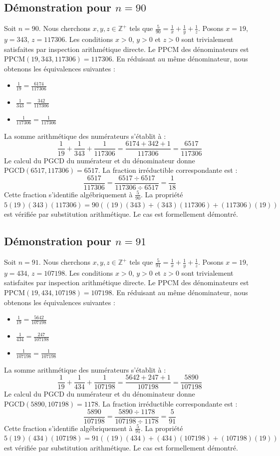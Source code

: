 \documentclass[12pt,a4paper]{article}
\begin{document}
\subsection{Démonstration pour $n = 90$}
Soit $n = 90$. Nous cherchons $x, y, z \in \mathbb{Z}^{+}$ tels que $\frac{5}{90} = \frac{1}{x} + \frac{1}{y} + \frac{1}{z}$.
Posons $x = 19$, $y = 343$, $z = 117306$.
Les conditions $x > 0$, $y > 0$ et $z > 0$ sont trivialement satisfaites par inspection arithmétique directe.
Le PPCM des dénominateurs est $\text{PPCM}(19, 343, 117306) = 117306$.
En réduisant au même dénominateur, nous obtenons les équivalences suivantes :
\begin{itemize}
    \item $\frac{1}{19} = \frac{6174}{117306}$
    \item $\frac{1}{343} = \frac{342}{117306}$
    \item $\frac{1}{117306} = \frac{1}{117306}$
\end{itemize}
La somme arithmétique des numérateurs s'établit à :
$$ \frac{1}{19} + \frac{1}{343} + \frac{1}{117306} = \frac{6174 + 342 + 1}{117306} = \frac{6517}{117306} $$
Le calcul du PGCD du numérateur et du dénominateur donne $\text{PGCD}(6517, 117306) = 6517$.
La fraction irréductible correspondante est :
$$ \frac{6517}{117306} = \frac{6517 \div 6517}{117306 \div 6517} = \frac{1}{18} $$
Cette fraction s'identifie algébriquement à $\frac{5}{90}$.
La propriété $5(19)(343)(117306) = 90((19)(343) + (343)(117306) + (117306)(19))$ est vérifiée par substitution arithmétique.
Le cas est formellement démontré.

\subsection{Démonstration pour $n = 91$}
Soit $n = 91$. Nous cherchons $x, y, z \in \mathbb{Z}^{+}$ tels que $\frac{5}{91} = \frac{1}{x} + \frac{1}{y} + \frac{1}{z}$.
Posons $x = 19$, $y = 434$, $z = 107198$.
Les conditions $x > 0$, $y > 0$ et $z > 0$ sont trivialement satisfaites par inspection arithmétique directe.
Le PPCM des dénominateurs est $\text{PPCM}(19, 434, 107198) = 107198$.
En réduisant au même dénominateur, nous obtenons les équivalences suivantes :
\begin{itemize}
    \item $\frac{1}{19} = \frac{5642}{107198}$
    \item $\frac{1}{434} = \frac{247}{107198}$
    \item $\frac{1}{107198} = \frac{1}{107198}$
\end{itemize}
La somme arithmétique des numérateurs s'établit à :
$$ \frac{1}{19} + \frac{1}{434} + \frac{1}{107198} = \frac{5642 + 247 + 1}{107198} = \frac{5890}{107198} $$
Le calcul du PGCD du numérateur et du dénominateur donne $\text{PGCD}(5890, 107198) = 1178$.
La fraction irréductible correspondante est :
$$ \frac{5890}{107198} = \frac{5890 \div 1178}{107198 \div 1178} = \frac{5}{91} $$
Cette fraction s'identifie algébriquement à $\frac{5}{91}$.
La propriété $5(19)(434)(107198) = 91((19)(434) + (434)(107198) + (107198)(19))$ est vérifiée par substitution arithmétique.
Le cas est formellement démontré.
\end{document}

